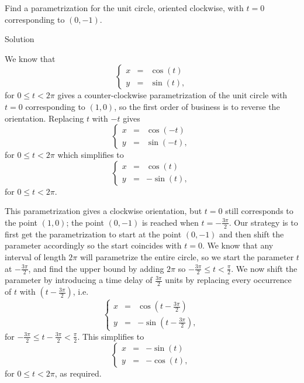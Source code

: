 \begin{example} \label{adjustparametricex}  
Find a parametrization for the unit circle, oriented clockwise, with $t=0$ corresponding to $(0,-1)$.


Solution 

We know that 
$$
\left\{\begin{array}{rcl} x & = & \cos(t)\\[0.2cm] y & = & \sin(t), \end{array}\right.
$$
for $0 \leq t < 2\pi$ gives a counter-clockwise parametrization of the unit circle with $t = 0$ corresponding to $(1,0)$, so the first order of business is to reverse the orientation.  Replacing $t$ with $-t$ gives 
$$
\left\{\begin{array}{rcl} x & = & \cos(-t)\\[0.2cm] y & = & \sin(-t), \end{array}\right.\,
$$
for $0 \leq t < 2\pi$
which simplifies to
$$
\left\{\begin{array}{rcl} x & = & \cos(t)\\[0.2cm] y & = & -\sin(t), \end{array}\right.\,
$$
for $0 \leq t < 2\pi$. 

 This parametrization gives a clockwise orientation, but $t=0$ still corresponds to the point $(1,0)$; the point $(0, -1)$ is reached when $t = -\frac{3\pi}{2}$.  Our strategy is to first get the parametrization to start at the point $(0,-1)$ and then shift the parameter accordingly so the start coincides with $t = 0$.  We know that any interval of length $2\pi$ will parametrize the entire circle, so we start the parameter $t$ at $-\frac{3\pi}{2}$, and find the upper bound by adding $2\pi$ so $-\frac{3\pi}{2} \leq t < \frac{\pi}{2}$.   We now shift the parameter by introducing a time delay of $\frac{3\pi}{2}$ units by replacing every occurrence of $t$ with $\left(t - \frac{3\pi}{2}\right)$, i.e.
$$
\left\{\begin{array}{rcl} x & = & \cos\left(t - \frac{3\pi}{2}\right)\\[0.2cm] y & = & -\sin\left(t - \frac{3\pi}{2}\right), \end{array}\right.\,
$$
 for  $-\frac{3\pi}{2} \leq t - \frac{3\pi}{2} < \frac{\pi}{2}$.  This simplifies to 
\begin{equation}
\left\{\begin{array}{rcl} x & = & -\sin(t)\\ y & = & -\cos(t), \end{array}\right.\,
\label{cycloide1}
\end{equation}
 for $ 0 \leq t  < 2\pi$, as required.


\end{example}

